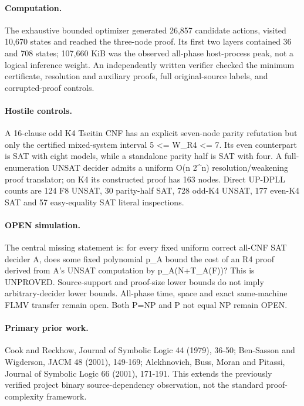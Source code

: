 \documentclass[11pt]{article}
\begin{document}
\paragraph{Computation.} The exhaustive bounded optimizer generated 26,857 candidate actions, visited 10,670 states and reached the three-node proof. Its first two layers contained 36 and 708 states; 107,660 KiB was the observed all-phase host-process peak, not a logical inference weight. An independently written verifier checked the minimum certificate, resolution and auxiliary proofs, full original-source labels, and corrupted-proof controls.
\paragraph{Hostile controls.} A 16-clause odd K4 Tseitin CNF has an explicit seven-node parity refutation but only the certified mixed-system interval 5 <= W_R4 <= 7. Its even counterpart is SAT with eight models, while a standalone parity half is SAT with four. A full-enumeration UNSAT decider admits a uniform O(n 2^n) resolution/weakening proof translator; on K4 its constructed proof has 163 nodes. Direct UP-DPLL counts are 124 F8 UNSAT, 30 parity-half SAT, 728 odd-K4 UNSAT, 177 even-K4 SAT and 57 easy-equality SAT literal inspections.
\paragraph{OPEN simulation.} The central missing statement is: for every fixed uniform correct all-CNF SAT decider A, does some fixed polynomial p_A bound the cost of an R4 proof derived from A's UNSAT computation by p_A(N+T_A(F))? This is UNPROVED. Source-support and proof-size lower bounds do not imply arbitrary-decider lower bounds. All-phase time, space and exact same-machine FLMV transfer remain open. Both P=NP and P not equal NP remain OPEN.
\paragraph{Primary prior work.} Cook and Reckhow, Journal of Symbolic Logic 44 (1979), 36-50; Ben-Sasson and Wigderson, JACM 48 (2001), 149-169; Alekhnovich, Buss, Moran and Pitassi, Journal of Symbolic Logic 66 (2001), 171-191. This extends the previously verified project binary source-dependency observation, not the standard proof-complexity framework.
\end{document}
